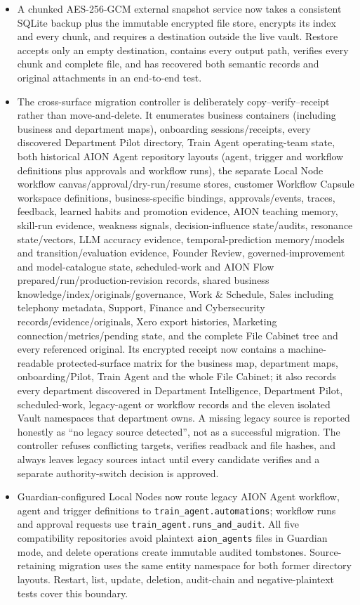 \documentclass[11pt]{article}
\newcommand{\code}[1]{\texttt{#1}}
\begin{document}
\begin{itemize}
  \item A chunked AES-256-GCM external snapshot service now takes a consistent SQLite backup plus the immutable encrypted file store, encrypts its index and every chunk, and requires a destination outside the live vault. Restore accepts only an empty destination, contains every output path, verifies every chunk and complete file, and has recovered both semantic records and original attachments in an end-to-end test.
  \item The cross-surface migration controller is deliberately copy--verify--receipt rather than move-and-delete. It enumerates business containers (including business and department maps), onboarding sessions/receipts, every discovered Department Pilot directory, Train Agent operating-team state, both historical AION Agent repository layouts (agent, trigger and workflow definitions plus approvals and workflow runs), the separate Local Node workflow canvas/approval/dry-run/resume stores, customer Workflow Capsule workspace definitions, business-specific bindings, approvals/events, traces, feedback, learned habits and promotion evidence, AION teaching memory, skill-run evidence, weakness signals, decision-influence state/audits, resonance state/vectors, LLM accuracy evidence, temporal-prediction memory/models and transition/evaluation evidence, Founder Review, governed-improvement and model-catalogue state, scheduled-work and AION Flow prepared/run/production-revision records, shared business knowledge/index/originals/governance, Work \& Schedule, Sales including telephony metadata, Support, Finance and Cybersecurity records/evidence/originals, Xero export histories, Marketing connection/metrics/pending state, and the complete File Cabinet tree and every referenced original. Its encrypted receipt now contains a machine-readable protected-surface matrix for the business map, department maps, onboarding/Pilot, Train Agent and the whole File Cabinet; it also records every department discovered in Department Intelligence, Department Pilot, scheduled-work, legacy-agent or workflow records and the eleven isolated Vault namespaces that department owns. A missing legacy source is reported honestly as ``no legacy source detected'', not as a successful migration. The controller refuses conflicting targets, verifies readback and file hashes, and always leaves legacy sources intact until every candidate verifies and a separate authority-switch decision is approved.
  \item Guardian-configured Local Nodes now route legacy AION Agent workflow, agent and trigger definitions to \code{train\_agent.automations}; workflow runs and approval requests use \code{train\_agent.runs\_and\_audit}. All five compatibility repositories avoid plaintext \code{aion\_agents} files in Guardian mode, and delete operations create immutable audited tombstones. Source-retaining migration uses the same entity namespace for both former directory layouts. Restart, list, update, deletion, audit-chain and negative-plaintext tests cover this boundary.

\end{itemize}
\end{document}
